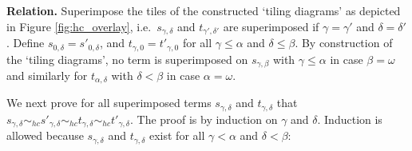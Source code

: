 \documentclass{LMCS}
\theoremstyle{plain}
\theoremstyle{definition}
\newcommand{\simhc}{\sim_{hc}}
\begin{document}
{\bf Relation.}
Superimpose the tiles of the constructed `tiling diagrams' as depicted in Figure \ref{fig:hc_overlay}, i.e.\ $s_{\gamma, \delta}$ and $t_{\gamma', \delta'}$ are superimposed if $\gamma = \gamma'$ and $\delta = \delta'$. Define $s_{0, \delta} = s'_{0, \delta}$, and $t_{\gamma, 0} = t'_{\gamma, 0}$ for all $\gamma \leq \alpha$ and $\delta \leq \beta$. By construction of the `tiling diagrams', no term is superimposed on $s_{\gamma, \beta}$ with $\gamma \leq \alpha$ in case $\beta = \omega$ and similarly for $t_{\alpha, \delta}$ with $\delta < \beta$ in case $\alpha = \omega$.

We next prove for all superimposed terms $s_{\gamma, \delta}$ and $t_{\gamma, \delta}$ that $s_{\gamma, \delta} \simhc s'_{\gamma, \delta} \simhc t_{\gamma, \delta} \simhc t'_{\gamma, \delta}$. The proof is by induction on $\gamma$ and $\delta$. Induction is allowed because $s_{\gamma, \delta}$ and $t_{\gamma, \delta}$ exist for all $\gamma < \alpha$ and $\delta < \beta$:
\end{document}
